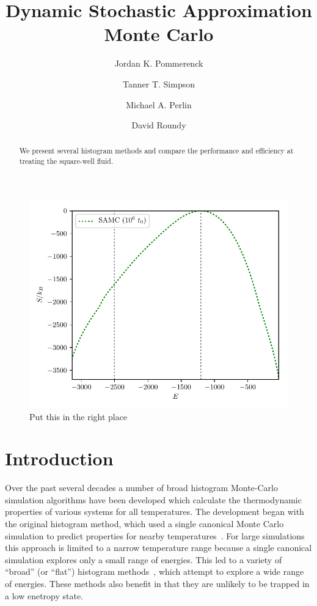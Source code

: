 \documentclass[letterpaper,twocolumn,amsmath,amssymb,pre,aps,10pt]{revtex4-1}
\begin{document}
\title{Dynamic Stochastic Approximation Monte Carlo}

\author{Jordan K. Pommerenck} \author{Tanner T. Simpson}
\author{Michael A. Perlin} \author{David Roundy}

\begin{abstract}
  We present several histogram methods and compare the performance and
  efficiency at treating the square-well fluid.
\end{abstract}

\maketitle

\begin{figure}
  \includegraphics[width=\columnwidth]{figs/N500-lndos-comparison}
  \caption{Put this in the right place}
\end{figure}

\section{Introduction}
Over the past several decades a number of broad histogram Monte-Carlo
simulation algorithms have been developed which calculate the
thermodynamic properties of various systems for all temperatures.  The
development began with the original histogram method, which used a
single canonical Monte Carlo simulation to predict properties for
nearby temperatures~\cite{ferrenberg1988new}.  For large simulations
this approach is limited to a narrow temperature range because a single
canonical simulation explores only a small range of energies.  This led
to a variety of ``broad'' (or ``flat'') histogram
methods~\cite{penna1996broad, penna1998broad, swendsen1999transition,
wang2001determining, wang2001efficient, trebst2004optimizing}, which
attempt to explore a wide range of energies.  These methods also
benefit in that they are unlikely to be trapped in a low enetropy state.
\end{document}

